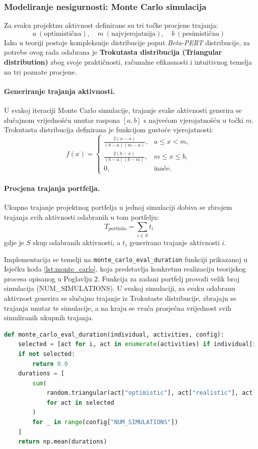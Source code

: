 \subsubsection{Modeliranje nesigurnosti: Monte Carlo simulacija}

Za svaku projektnu aktivnost definirane su tri točke procjene trajanja:
\[
a \ (\text{optimistična}), \quad
m \ (\text{najvjerojatnija}), \quad
b \ (\text{pesimistična})
\]
Iako u teoriji postoje kompleksnije distribucije poput \textit{Beta-PERT} distribucije, 
za potrebe ovog rada odabrana je \textbf{Trokutasta distribucija (Triangular distribution)} 
zbog svoje praktičnosti, računalne efikasnosti i intuitivnog temelja na tri poznate procjene.

\paragraph{Generiranje trajanja aktivnosti.}
U svakoj iteraciji Monte Carlo simulacije, trajanje svake aktivnosti generira se slučajnom vrijednošću 
unutar raspona $[a, b]$ s najvećom vjerojatnošću u točki $m$.  
Trokutasta distribucija definirana je funkcijom gustoće vjerojatnosti:
\[
f(x) =
\begin{cases}
\frac{2(x-a)}{(b-a)(m-a)}, & a \leq x < m, \\
\frac{2(b-x)}{(b-a)(b-m)}, & m \leq x \leq b, \\
0, & \text{inače}.
\end{cases}
\]

\paragraph{Procjena trajanja portfelja.}
Ukupno trajanje projektnog portfelja u jednoj simulaciji dobiva se zbrojem trajanja svih aktivnosti odabranih u tom portfelju:
\[
T_{\text{portfolio}} = \sum_{i \in S} t_i
\]
gdje je $S$ skup odabranih aktivnosti, a $t_i$ generirano trajanje aktivnosti $i$.

Implementacija se temelji na \texttt{monte\_carlo\_eval\_duration} funkciji prikazanoj u Isječku koda \ref{lst:monte_carlo}, koja predstavlja konkretnu realizaciju teorijskog procesa opisanog u Poglavlju 2. Funkcija za zadani portfelj provodi velik broj simulacija (NUM_SIMULATIONS). U svakoj simulaciji, za svaku odabranu aktivnost generira se slučajno trajanje iz Trokutaste distribucije, zbrajaju se trajanja unutar te simulacije, a na kraju se vraća prosječna vrijednost svih simuliranih ukupnih trajanja.
\begin{lstlisting}[language=Python, caption={Funkcija za Monte Carlo procjenu trajanja}, label={lst:monte_carlo}, captionpos=b]
def monte_carlo_eval_duration(individual, activities, config):
    selected = [act for i, act in enumerate(activities) if individual[i] == 1]
    if not selected:
        return 0.0
    durations = [
        sum(
            random.triangular(act["optimistic"], act["realistic"], act["pessimistic"])
            for act in selected
        )
        for _ in range(config["NUM_SIMULATIONS"])
    ]
    return np.mean(durations)
\end{lstlisting}


